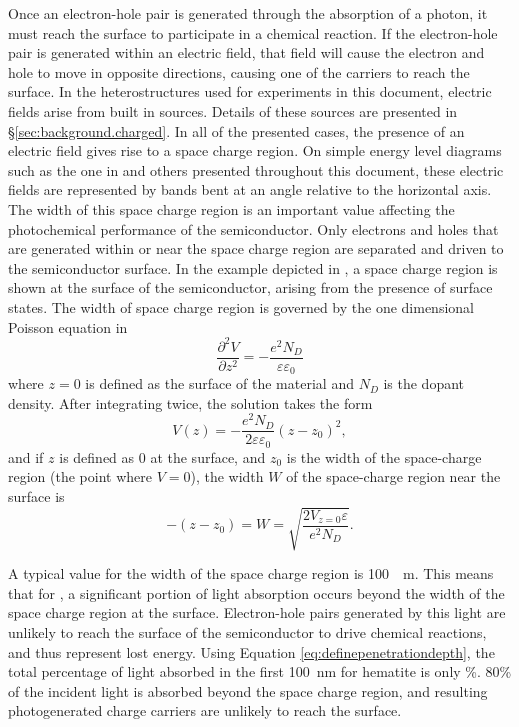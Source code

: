 Once an electron-hole pair is generated through the absorption of a photon, 
it must reach the surface to participate in a chemical reaction. If the 
electron-hole pair is generated within an electric field,  that field will 
cause the electron and hole to move in opposite directions, causing one of 
the carriers to reach the surface. In the heterostructures used for 
experiments in this document, electric fields arise from built in sources. 
Details of these sources are presented in \S\ref{sec:background.charged}. 
In all of the presented cases, the presence of an electric field gives rise 
to a space charge region. On simple energy level diagrams such as the one 
in  and others presented throughout this document, 
these electric fields are represented by bands bent at an angle relative to 
the horizontal axis. The width of this space charge region is an important 
value affecting the photochemical performance of the semiconductor. Only 
electrons and holes that are generated within or near the space charge 
region are separated and driven to the semiconductor surface. In the 
example depicted in , a space charge region is 
shown at the surface of the semiconductor, arising from the presence of 
surface states. The width of space charge region is governed by the one 
dimensional Poisson equation in 
\begin{equation}
	\label{eq:poisson}
	\frac{\partial^{2}V}{{\partial}z^{2}}=-\frac{e^{2}N_{D}}%
		{\varepsilon \varepsilon_{0}}
\end{equation}
where $z=0$ is defined as the surface of the material and $N_{D}$ is the 
dopant density. After integrating twice, the solution takes the form
\begin{equation}
	\label{eq:poissonsolved}
	V(z)=-\frac{e^{2}N_{D}}{2\varepsilon \varepsilon_{0}}(z-z_{0})^{2},
\end{equation}
and if $z$ is defined as 0 at the surface, and $z_{0}$ is the width of the 
space-charge region (the point where $V=0$), the width $W$ of the space-charge region near the surface is
\begin{equation}
	\label{eq:spacechargewidth}
	-(z-z_{0})=W=\sqrt{\frac{2V_{z=0}\varepsilon}{e^{2}N_{D}}}\text{.}
\end{equation}

A typical value for the width of the space charge region is \SI{100}{\nano%
\meter}. This means that for , a significant portion of light 
absorption occurs beyond the width of the space charge region at the 
surface. Electron-hole pairs generated by this light are unlikely to reach 
the surface of the semiconductor to drive chemical reactions, and thus 
represent lost energy. Using Equation \ref{eq:definepenetrationdepth}, the 
total percentage of light absorbed in the first \SI{100}{\nano\meter} for 
hematite is only \%. 80\% of the incident light is absorbed 
beyond the space charge region, and resulting photogenerated charge 
carriers are unlikely to reach the surface.

